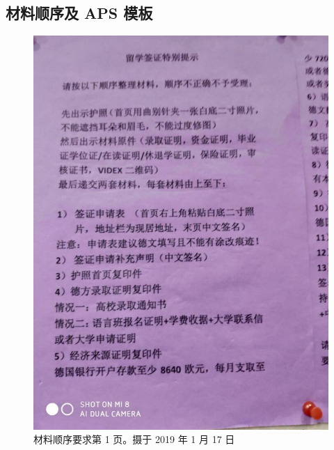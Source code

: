 \documentclass[oneside,final]{book}
\begin{document}
\begin{appendices}



\section{材料顺序及 APS 模板}
\begin{figure}[htbp]
  \centering
  \includegraphics[width=\textwidth]{order-1}
  \caption{材料顺序要求第 1 页。摄于 2019 年 1 月 17 日}
  \label{fig:order-1}
\end{figure}
\begin{figure}[htbp]
  \centering

\end{figure}
\end{appendices}
\end{document}
